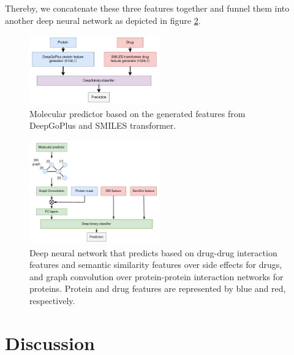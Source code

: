 \documentclass{bioinfo}
\begin{document}
Thereby, we concatenate these three features together and funnel them into another deep neural network as depicted in figure \ref{fig:02}.  

\begin{figure}[!tpb]%
	
	\centerline{\includegraphics[width=0.5\textwidth]{figures/MolecularPredictor.png}}
	\caption{Molecular predictor based on the generated features from DeepGoPlus and SMILES transformer.}\label{fig:01}
\end{figure}

\begin{figure}[!tpb]%

\centerline{\includegraphics[width=0.5\textwidth]{figures/InteractionNetwork.png}}
\caption{Deep neural network that predicts based on drug-drug interaction features and semantic similarity features over side effects for drugs, and graph convolution over protein-protein interaction networks for proteins. Protein and drug features are represented by blue and red, respectively.}\label{fig:02}
\end{figure}

\section{Discussion}







%
%
\end{document}
